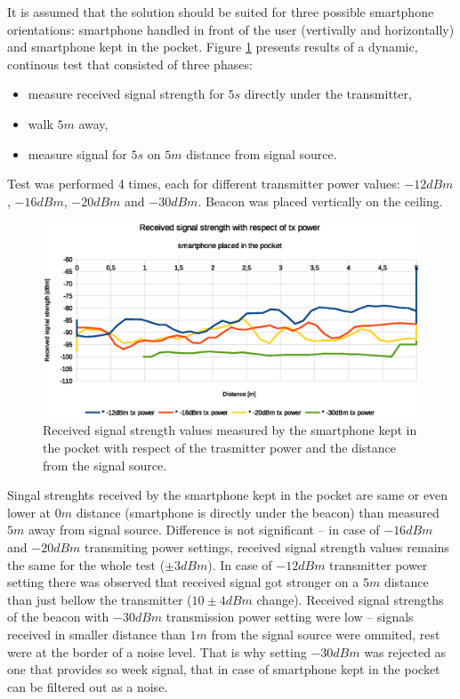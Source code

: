 \documentclass[../main.tex]{subfiles}
\begin{document}
It is assumed that the solution should be suited for three possible smartphone orientations: smartphone handled in front of the user (vertivally and horizontally) and smartphone kept in the pocket. Figure \ref{fig:tests_case2_smartphone_in_pocket_tx_power} presents results of a dynamic, continous test that consisted of three phases:
\begin{itemize}
	\item measure received signal strength for $5 s$ directly under the transmitter,
	\item walk $5 m$ away,
	\item measure signal for $5 s$ on $5 m$ distance from signal source.
\end{itemize}

 Test was performed 4 times, each for different transmitter power values: $-12dBm$, $-16dBm$, $-20dBm$ and $-30dBm$. Beacon was placed vertically on the ceiling.

\begin{figure}[ht]
\includegraphics[width=\textwidth, keepaspectratio]{pictures/tests_case2_smartphone_in_pocket_tx_power}
\centering
\caption{Received signal strength values measured by the smartphone kept in the pocket with respect of the trasmitter power and the distance from the signal source.}
\label{fig:tests_case2_smartphone_in_pocket_tx_power}
\end{figure}

Singal strenghts received by the smartphone kept in the pocket are same or even lower at $0m$ distance (smartphone is directly under the beacon) than measured $5m$ away from signal source. Difference is not significant -- in case of $-16dBm$ and $-20dBm$ transmiting power settings, received signal strength values remains the same for the whole test ($\pm 3dBm$). In case of $-12dBm$ transmitter power setting there was observed that received signal got stronger on a $5m$ distance than just bellow the transmitter ($10\pm4 dBm$ change). Received signal strengths of the beacon with $-30dBm$ transmission power setting were low -- signals received in smaller distance than $1m$ from the signal source were ommited, rest were at the border of a noise level. That is why setting $-30dBm$ was rejected as one that provides so week signal, that in case of smartphone kept in the pocket can be filtered out as a noise.
\end{document}
